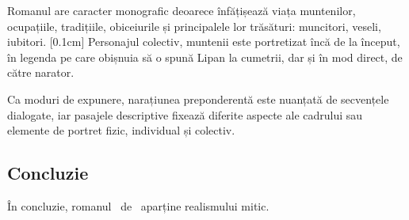 Romanul are caracter monografic deoarece înfățișează viața muntenilor, ocupațiile, tradițiile, obiceiurile și principalele lor trăsături: muncitori, veseli, iubitori.
[0.1cm]
Personajul colectiv, muntenii este portretizat încă de la început, în legenda pe care obișnuia să o spună Lipan la cumetrii, dar și în mod direct, de către narator.

Ca moduri de expunere, narațiunea preponderentă este nuanțată de secvențele dialogate, iar pasajele descriptive fixează diferite aspecte ale cadrului sau elemente de portret fizic, individual și colectiv.


\subsection{Concluzie}
În concluzie, romanul \operatitle\ de \operaauthor\ aparține realismului mitic.
